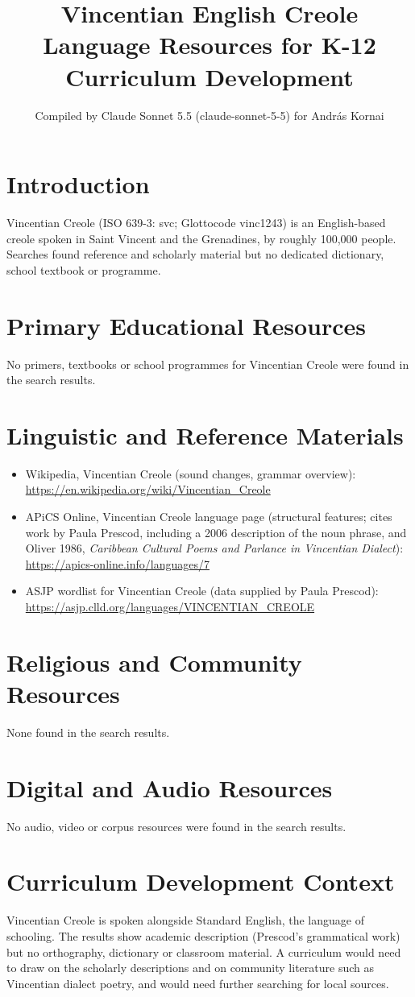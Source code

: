 \documentclass[12pt]{article}
\title{Vincentian English Creole Language Resources for K-12 Curriculum Development}
\author{Compiled by Claude Sonnet 5.5 (claude-sonnet-5-5) for Andr\'as Kornai}
\date{}
\begin{document}
\maketitle

\section{Introduction}
Vincentian Creole (ISO 639-3: svc; Glottocode vinc1243) is an English-based creole spoken in Saint Vincent and the Grenadines, by roughly 100,000 people. Searches found reference and scholarly material but no dedicated dictionary, school textbook or programme.

\section{Primary Educational Resources}
No primers, textbooks or school programmes for Vincentian Creole were found in the search results.

\section{Linguistic and Reference Materials}
\begin{itemize}
\item Wikipedia, Vincentian Creole (sound changes, grammar overview): \url{https://en.wikipedia.org/wiki/Vincentian_Creole}
\item APiCS Online, Vincentian Creole language page (structural features; cites work by Paula Prescod, including a 2006 description of the noun phrase, and Oliver 1986, \emph{Caribbean Cultural Poems and Parlance in Vincentian Dialect}): \url{https://apics-online.info/languages/7}
\item ASJP wordlist for Vincentian Creole (data supplied by Paula Prescod): \url{https://asjp.clld.org/languages/VINCENTIAN_CREOLE}
\end{itemize}

\section{Religious and Community Resources}
None found in the search results.

\section{Digital and Audio Resources}
No audio, video or corpus resources were found in the search results.

\section{Curriculum Development Context}
Vincentian Creole is spoken alongside Standard English, the language of schooling. The results show academic description (Prescod's grammatical work) but no orthography, dictionary or classroom material. A curriculum would need to draw on the scholarly descriptions and on community literature such as Vincentian dialect poetry, and would need further searching for local sources.
\end{document}
